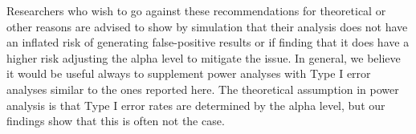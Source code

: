Researchers who wish to go against these recommendations for theoretical or other reasons are advised to show by simulation that their analysis does not have an inflated risk of generating false-positive results or if finding that it does have a higher risk adjusting the alpha level to mitigate the issue. In general, we believe it would be useful always to supplement power analyses with Type I error analyses similar to the ones reported here. The theoretical assumption in power analysis is that Type I error rates are determined by the alpha level, but our findings show that this is often not the case.




 
